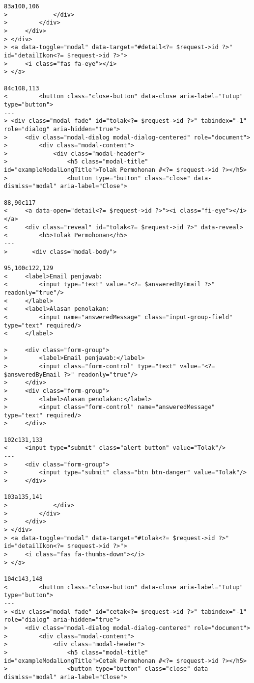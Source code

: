 \begin{lstlisting}
83a100,106
>             </div>
>         </div>
>     </div>
> </div>
> <a data-toggle="modal" data-target="#detail<?= $request->id ?>" id="detailIkon<?= $request->id ?>">
>     <i class="fas fa-eye"></i>
> </a>

84c108,113
<         <button class="close-button" data-close aria-label="Tutup" type="button">
---
> <div class="modal fade" id="tolak<?= $request->id ?>" tabindex="-1" role="dialog" aria-hidden="true">
>     <div class="modal-dialog modal-dialog-centered" role="document">
>         <div class="modal-content">
>             <div class="modal-header">
>                 <h5 class="modal-title" id="exampleModalLongTitle">Tolak Permohonan #<?= $request->id ?></h5>
>                 <button type="button" class="close" data-dismiss="modal" aria-label="Close">

88,90c117
<     <a data-open="detail<?= $request->id ?>"><i class="fi-eye"></i></a>
<     <div class="reveal" id="tolak<?= $request->id ?>" data-reveal>
<         <h5>Tolak Permohonan</h5>
---
>     	<div class="modal-body">

95,100c122,129
<     <label>Email penjawab:
<         <input type="text" value="<?= $answeredByEmail ?>" readonly="true"/>
<     </label>
<     <label>Alasan penolakan:
<         <input name="answeredMessage" class="input-group-field" type="text" required/>
<     </label>
---
>     <div class="form-group">
>         <label>Email penjawab:</label>
>         <input class="form-control" type="text" value="<?= $answeredByEmail ?>" readonly="true"/>
>     </div>
>     <div class="form-group">
>         <label>Alasan penolakan:</label>
>         <input class="form-control" name="answeredMessage" type="text" required/>
>     </div>

102c131,133
<     <input type="submit" class="alert button" value="Tolak"/>
---
>     <div class="form-group">
>         <input type="submit" class="btn btn-danger" value="Tolak"/>
>     </div>

103a135,141
>             </div>
>         </div>
>     </div>
> </div>
> <a data-toggle="modal" data-target="#tolak<?= $request->id ?>" id="detailIkon<?= $request->id ?>">
>     <i class="fas fa-thumbs-down"></i>
> </a>

104c143,148
<         <button class="close-button" data-close aria-label="Tutup" type="button">
---
> <div class="modal fade" id="cetak<?= $request->id ?>" tabindex="-1" role="dialog" aria-hidden="true">
>     <div class="modal-dialog modal-dialog-centered" role="document">
>         <div class="modal-content">
>             <div class="modal-header">
>                 <h5 class="modal-title" id="exampleModalLongTitle">Cetak Permohonan #<?= $request->id ?></h5>
>                 <button type="button" class="close" data-dismiss="modal" aria-label="Close">


\end{lstlisting}
